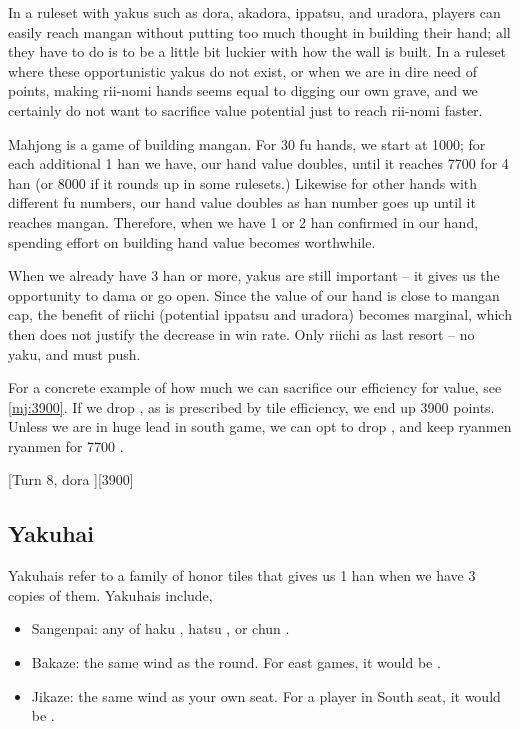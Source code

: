 \documentclass[12pt]{article}
\begin{document}
In a ruleset with yakus such as dora, akadora, ippatsu, and uradora, players can easily reach mangan without putting too much thought in building their hand; all they have to do is to be a little bit luckier with how the wall is built. In a ruleset where these opportunistic yakus do not exist, or when we are in dire need of points, making rii-nomi hands seems equal to digging our own grave, and we certainly do not want to sacrifice value potential just to reach rii-nomi faster.

Mahjong is a game of building mangan. For 30 fu hands, we start at 1000; for each additional 1 han we have, our hand value doubles, until it reaches 7700 for 4 han (or 8000 if it rounds up in some rulesets.) Likewise for other hands with different fu numbers, our hand value doubles as han number goes up until it reaches mangan. Therefore, when we have 1 or 2 han confirmed in our hand, spending effort on building hand value becomes worthwhile.

When we already have 3 han or more, yakus are still important -- it gives us the opportunity to dama or go open. Since the value of our hand is close to mangan cap, the benefit of riichi (potential ippatsu and uradora) becomes marginal, which then does not justify the decrease in win rate. Only riichi as last resort -- no yaku, and must push.

For a concrete example of how much we can sacrifice our efficiency for value, see \ref{mj:3900}. If we drop , as is prescribed by tile efficiency, we end up 3900 points. Unless we are in huge lead in south game, we can opt to drop , and keep ryanmen ryanmen for 7700 \citep[][pp.~98--99]{fkt}.

[Turn 8, dora ][3900]


\subsection{Yakuhai} \label{sub:yakuhai}

Yakuhais refer to a family of honor tiles that gives us 1 han when we have 3 copies of them. Yakuhais include,

\begin{itemize}
  \item Sangenpai: any of haku , hatsu , or chun .
  \item Bakaze: the same wind as the round. For east games, it would be .
  \item Jikaze: the same wind as your own seat. For a player in South seat, it would be .
\end{itemize}
\end{document}
